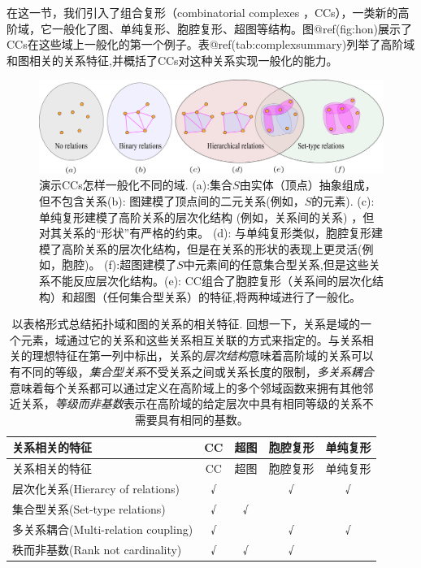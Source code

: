 \documentclass[
  12pt,
]{krantz}
\begin{document}
在这一节，我们引入了组合复形（combinatorial complexes
，CCs），一类新的高阶域，它一般化了图、单纯复形、胞腔复形、超图等结构。图@ref(fig:hon)展示了CCs在这些域上一般化的第一个例子。表@ref(tab:complexsummary)列举了高阶域和图相关的关系特征,并概括了CCs对这种关系实现一般化的能力。

\begin{figure}

{\centering \includegraphics{figures/hon} 

}

\caption{演示CCs怎样一般化不同的域. (a):集合$S$由实体（顶点）抽象组成，但不包含关系(b): 图建模了顶点间的二元关系(例如，$S$的元素). (c): 单纯复形建模了高阶关系的层次化结构 (例如，关系间的关系) ，但对其关系的“形状”有严格的约束。 (d): 与单纯复形类似，胞腔复形建模了高阶关系的层次化结构，但是在关系的形状的表现上更灵活(例如，胞腔)。 (f):超图建模了$S$中元素间的任意集合型关系,但是这些关系不能反应层次化结构。(e): CC组合了胞腔复形（关系间的层次化结构）和超图（任何集合型关系）的特征,将两种域进行了一般化。}\label{fig:hon}
\end{figure}

\begin{longtable}[]{@{}lcccc@{}}
\caption{以表格形式总结拓扑域和图的关系的相关特征.
回想一下，关系是域的一个元素，域通过它的关系和这些关系相互关联的方式来指定的。与关系相关的理想特征在第一列中标出，关系的\emph{层次结构}意味着高阶域的关系可以有不同的等级，\emph{集合型关系}不受关系之间或关系长度的限制，\emph{多关系耦合}意味着每个关系都可以通过定义在高阶域上的多个邻域函数来拥有其他邻近关系，\emph{等级而非基数}表示在高阶域的给定层次中具有相同等级的关系不需要具有相同的基数。}\tabularnewline
\toprule\noalign{}
关系相关的特征 & CC & 超图 & 胞腔复形 & 单纯复形 \\
\midrule\noalign{}
\endfirsthead
\toprule\noalign{}
关系相关的特征 & CC & 超图 & 胞腔复形 & 单纯复形 \\
\midrule\noalign{}
\endhead
\bottomrule\noalign{}
\endlastfoot
层次化关系(Hierarcy of relations) & √ & & √ & √ \\
集合型关系(Set-type relations) & √ & √ & & \\
多关系耦合(Multi-relation coupling) & √ & & √ & √ \\
秩而非基数(Rank not cardinality) & √ & √ & √ & \\
\end{longtable}
\end{document}
